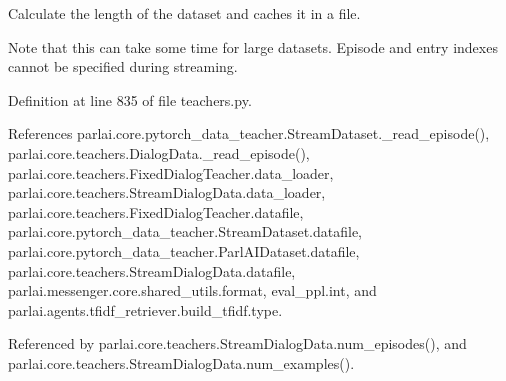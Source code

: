 \begin{DoxyVerb}Calculate the length of the dataset and caches it in a file.

Note that this can take some time for large datasets. Episode and entry
indexes cannot be specified during streaming.
\end{DoxyVerb}
 

Definition at line 835 of file teachers.\+py.



References parlai.\+core.\+pytorch\+\_\+data\+\_\+teacher.\+Stream\+Dataset.\+\_\+read\+\_\+episode(), parlai.\+core.\+teachers.\+Dialog\+Data.\+\_\+read\+\_\+episode(), parlai.\+core.\+teachers.\+Fixed\+Dialog\+Teacher.\+data\+\_\+loader, parlai.\+core.\+teachers.\+Stream\+Dialog\+Data.\+data\+\_\+loader, parlai.\+core.\+teachers.\+Fixed\+Dialog\+Teacher.\+datafile, parlai.\+core.\+pytorch\+\_\+data\+\_\+teacher.\+Stream\+Dataset.\+datafile, parlai.\+core.\+pytorch\+\_\+data\+\_\+teacher.\+Parl\+A\+I\+Dataset.\+datafile, parlai.\+core.\+teachers.\+Stream\+Dialog\+Data.\+datafile, parlai.\+messenger.\+core.\+shared\+\_\+utils.\+format, eval\+\_\+ppl.\+int, and parlai.\+agents.\+tfidf\+\_\+retriever.\+build\+\_\+tfidf.\+type.



Referenced by parlai.\+core.\+teachers.\+Stream\+Dialog\+Data.\+num\+\_\+episodes(), and parlai.\+core.\+teachers.\+Stream\+Dialog\+Data.\+num\+\_\+examples().

